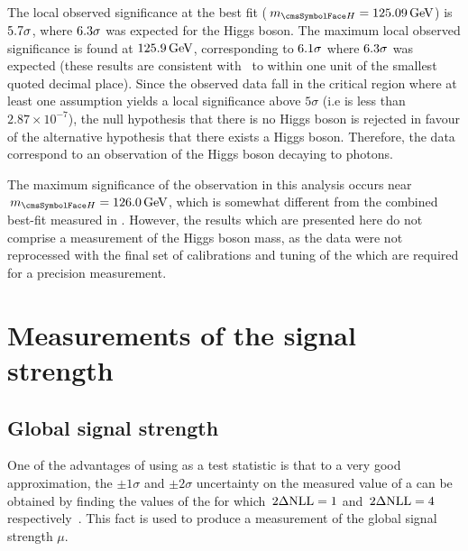 The local observed significance at the \RunI best fit ($\mH=125.09\GeV$) is $5.7\sigma$, where $6.3\sigma$ was expected for the \SM Higgs boson. The maximum local observed significance is found at $125.9\,\text{Ge\hspace{-.08em}V}$, corresponding to $6.1\sigma$ where $6.3\sigma$ was expected (these results are consistent with~\cite{CMS-PAS-HIG-16-020} to within one unit of the smallest quoted decimal place). %
Since the observed data fall in the critical region where at least one \mH assumption yields a local significance above $5\sigma$ (i.e \pvalue is less than $2.87 \times 10^{-7}$), the null hypothesis that there is no Higgs boson is rejected in favour of the alternative hypothesis that there exists a Higgs boson. Therefore, the data correspond to an observation of the Higgs boson decaying to photons.

The maximum significance of the observation in this analysis occurs near $\mH=126.0\GeV$, which is somewhat different from the combined best-fit \mH measured in \RunI. %
However, the results which are presented here do not comprise a measurement of the Higgs boson mass, as the data were not reprocessed with the final set of \ECAL calibrations and tuning of the \PhoEnergyBdt which are required for a precision measurement. %

\section{Measurements of the signal strength}
\label{sec:statandresults:sigstrength}
\subsection{Global signal strength}
\label{sec:statandresults:sigstrength_global}

One of the advantages of using \DNLL as a test statistic is that to a very good approximation, the $\pm 1 \sigma$ and $\pm 2 \sigma$ uncertainty on the measured value of a \POI can be obtained by finding the values of the \POI for which $\,2\Delta\text{NLL}=1$ and $\,2\Delta\text{NLL}=4$ respectively~\cite{Cowan}. %
This fact is used to produce a measurement of the global signal strength $\mu$. 

